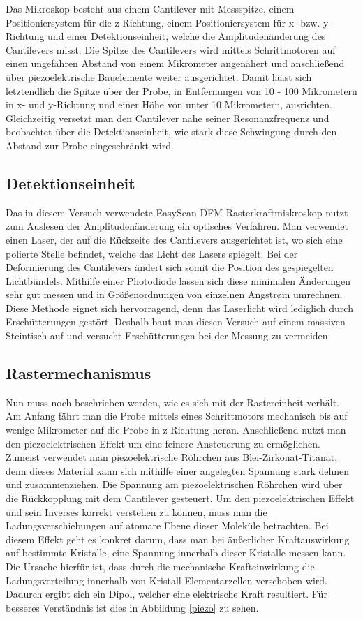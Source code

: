 Das Mikroskop besteht aus einem Cantilever mit Messspitze, einem Positioniersystem für die z-Richtung, einem Positioniersystem für x- bzw. y-Richtung und einer Detektionseinheit, welche die Amplitudenänderung des Cantilevers misst.  
Die Spitze des Cantilevers wird mittels Schrittmotoren auf einen ungefähren Abstand von einem Mikrometer angenähert und anschließend über piezoelektrische Bauelemente weiter ausgerichtet.
Damit lääst sich letztendlich die Spitze über der Probe, in Entfernungen von 10 - 100 Mikrometern in x- und y-Richtung und einer Höhe von unter 10 Mikrometern, ausrichten.
Gleichzeitig versetzt man den Cantilever nahe seiner Resonanzfrequenz und beobachtet über die Detektionseinheit, wie stark diese Schwingung durch den Abstand zur Probe eingeschränkt wird.

 \subsection{Detektionseinheit}
 
 Das in diesem Versuch verwendete EasyScan DFM Rasterkraftmiskroskop nutzt zum Auslesen der Amplitudenänderung ein optisches Verfahren. 
 Man verwendet einen Laser, der auf die Rückseite des Cantilevers ausgerichtet ist, wo sich eine polierte Stelle befindet, welche das Licht des Lasers spiegelt.
 Bei der Deformierung des Cantilevers ändert sich somit die Position des gespiegelten Lichtbündels.
 Mithilfe einer Photodiode lassen sich diese minimalen Änderungen sehr gut messen und in Größenordnungen von einzelnen Angstrøm umrechnen.
 Diese Methode eignet sich hervorragend, denn das Laserlicht wird lediglich durch Erschütterungen gestört.
 Deshalb baut man diesen Versuch auf einem massiven Steintisch auf und versucht Erschütterungen bei der Messung zu vermeiden.

\subsection{Rastermechanismus}

Nun muss noch beschrieben werden, wie es sich mit der Rastereinheit verhält.
Am Anfang fährt man die Probe mittels eines Schrittmotors mechanisch bis auf wenige Mikrometer auf die Probe in z-Richtung heran.
Anschließend nutzt man den piezoelektrischen Effekt um eine feinere Ansteuerung zu ermöglichen.
Zumeist verwendet man piezoelektrische Röhrchen aus Blei-Zirkonat-Titanat, denn dieses Material kann sich mithilfe einer angelegten Spannung stark dehnen und zusammenziehen. 
Die Spannung am piezoelektrischen Röhrchen wird über die Rückkopplung mit dem Cantilever gesteuert. 
Um den piezoelektrischen Effekt und sein Inverses korrekt verstehen zu können, muss man die Ladungsverschiebungen auf atomare Ebene dieser Moleküle betrachten.
Bei diesem Effekt geht es konkret darum, dass man bei äußerlicher Kraftauswirkung auf bestimmte Kristalle, eine Spannung innerhalb dieser Kristalle messen kann.
Die Ursache hierfür ist, dass durch die mechanische Krafteinwirkung die Ladungsverteilung innerhalb von Kristall-Elementarzellen verschoben wird.
Dadurch ergibt sich ein Dipol, welcher eine elektrische Kraft resultiert.
Für besseres Verständnis ist dies in Abbildung \ref{piezo} zu sehen.

